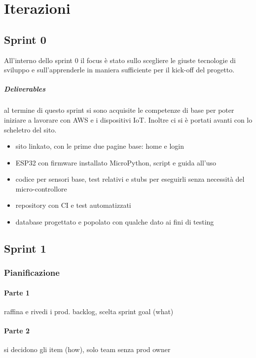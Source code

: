 \chapter{Iterazioni}

\section{Sprint 0}
All'interno dello sprint 0 il focus è stato sullo scegliere le giuste tecnologie di sviluppo e sull'apprenderle in maniera sufficiente per il kick-off del progetto.

\paragraph{Deliverables} al termine di questo sprint si sono acquisite le competenze di base per poter iniziare a lavorare con AWS e i dispositivi IoT. Inoltre ci si è portati avanti con lo scheletro del sito.
\begin{itemize}
    \item sito linkato, con le prime due pagine base: home e login
    \item ESP32 con firmware installato MicroPython, script e guida all'uso
    \item codice per sensori base, test relativi e stubs per eseguirli senza necessità del micro-controllore
    \item repository con CI e test automatizzati 
    \item database progettato e popolato con qualche dato ai fini di testing
    
\end{itemize}

\section{Sprint 1}
    \subsection{Pianificazione}
        \subsubsection{Parte 1} 
            raffina e rivedi i prod. backlog, scelta sprint goal (what)
        \subsubsection{Parte 2}
            si decidono gli item (how), solo team senza prod owner
